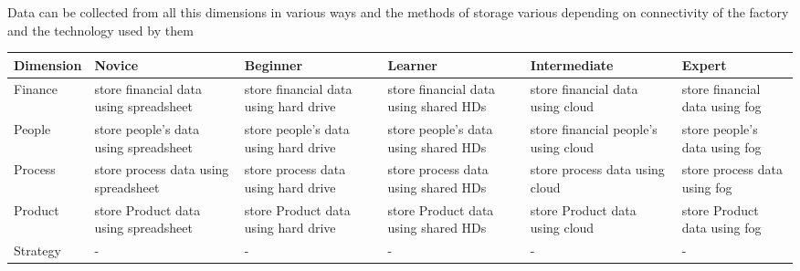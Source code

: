 \documentclass{article}
\begin{document}
\begin{normalsize}
\begin{itemize}
{}
\end{itemize}
	Data can be collected from all this dimensions in various ways and the methods of storage various depending on connectivity of the factory and the technology used by them
	\begin{center}
	
	
	\begin{tabu} to 0.8\textwidth { | X[c,] | X[c] | X[c] |  X[c]| X[c]| X[c]|}
	 \hline
	 Dimension & Novice & Beginner & Learner & Intermediate & Expert \\	
	 \hline
	 Finance & store financial data using spreadsheet & store financial data using hard drive & store financial data using shared HDs & store financial data using cloud & store financial data using fog \\
	\hline
	 People & store people’s data using spreadsheet & store people’s data using hard drive & store people’s data using shared HDs & store financial people’s using cloud & store people’s data using fog \\
	 \hline
	 Process & store process data using spreadsheet & store process data using hard drive & store process data using shared HDs & store process data using cloud & store process data using fog \\
	 \hline
	 Product & store Product data using spreadsheet & store Product data using hard drive & store Product data using shared HDs & store Product data using cloud & store Product data using fog \\
	 \hline
	 Strategy & - & - & - & - &-\\
	 \hline
	\end{tabu}
	\end{center}



	
\end{normalsize}
  
\end{document}
